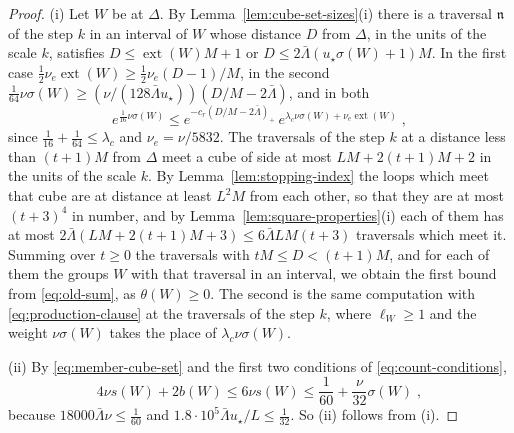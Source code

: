 \documentclass[11pt]{preprint}
\numberwithin{equation}{section}
\theoremstyle{definition}
\theoremstyle{remark}
\theoremstyle{plain}
\begin{document}
\begin{proof}
(i) Let $W$ be at $\Delta$. By Lemma~\ref{lem:cube-set-sizes}(i) there is a traversal $\mathfrak n$ of the step $k$ in an interval of $W$ whose distance $D$ from $\Delta$, in the units of the scale $k$, satisfies $D \leq \operatorname{ext}(W)M + 1$ or $D \leq 2\bar\Lambda(u_\star\sigma(W) + 1)M$. In the first case $\frac12\nu_e\operatorname{ext}(W) \geq \frac12\nu_e(D - 1)/M$, in the second $\frac{1}{64}\nu\sigma(W) \geq (\nu/(128\bar\Lambda u_\star))(D/M - 2\bar\Lambda)$, and in both
\[
    e^{\frac{1}{16}\nu\sigma(W)} \leq e^{-c_r(D/M - 2\bar\Lambda)_+}\,e^{\lambda_c\nu\sigma(W) + \nu_e\operatorname{ext}(W)}\;,
\]
since $\frac{1}{16} + \frac{1}{64} \leq \lambda_c$ and $\nu_e = \nu/5832$. The traversals of the step $k$ at a distance less than $(t + 1)M$ from $\Delta$ meet a cube of side at most $LM + 2(t + 1)M + 2$ in the units of the scale $k$. By Lemma~\ref{lem:stopping-index} the loops which meet that cube are at distance at least $L^2M$ from each other, so that they are at most $(t + 3)^4$ in number, and by Lemma~\ref{lem:square-properties}(i) each of them has at most $2\bar\Lambda(LM + 2(t + 1)M + 3) \leq 6\bar\Lambda LM(t + 3)$ traversals which meet it. Summing over $t \geq 0$ the traversals with $tM \leq D < (t + 1)M$, and for each of them the groups $W$ with that traversal in an interval, we obtain the first bound from \eqref{eq:old-sum}, as $\theta(W) \geq 0$. The second is the same computation with \eqref{eq:production-clause} at the traversals of the step $k$, where $\ell_W \geq 1$ and the weight $\nu\sigma(W)$ takes the place of $\lambda_c\nu\sigma(W)$.

(ii) By \eqref{eq:member-cube-set} and the first two conditions of \eqref{eq:count-conditions},
\begin{equation}\label{eq:member-share}
    4\nu s(W) + 2b(W) \leq 6\nu s(W) \leq \frac{1}{60} + \frac{\nu}{32}\sigma(W)\;,
\end{equation}
because $18000\bar\Lambda\nu \leq \frac{1}{60}$ and $1.8 \cdot 10^5\bar\Lambda u_\star/L \leq \frac{1}{32}$. So (ii) follows from (i).


\end{proof}
\end{document}
